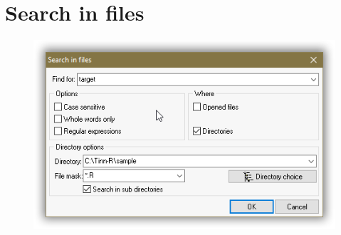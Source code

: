 
\hypertarget{working_searchinfiles}{}
\section{Search in files}

\begin{figure}[H]
  \includegraphics[scale=0.35]{./res/searchinfiles.png}~~

\end{figure}
